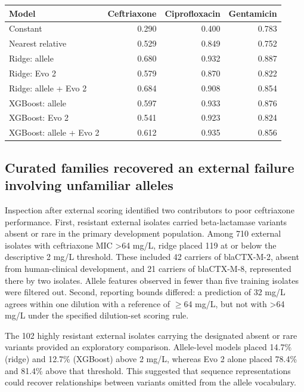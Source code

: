 \documentclass[
  american,
  11pt,
]{article}
\newcounter{none} %
\begin{document}
{\def\LTcaptype{none} %
\begin{longtable}[]{@{}lrrr@{}}
\toprule\noalign{}
Model & Ceftriaxone & Ciprofloxacin & Gentamicin \\
\midrule\noalign{}
\endhead
\bottomrule\noalign{}
\endlastfoot
Constant & 0.290 & 0.400 & 0.783 \\
Nearest relative & 0.529 & 0.849 & 0.752 \\
Ridge: allele & 0.680 & 0.932 & 0.887 \\
Ridge: Evo 2 & 0.579 & 0.870 & 0.822 \\
Ridge: allele + Evo 2 & 0.684 & 0.908 & 0.854 \\
XGBoost: allele & 0.597 & 0.933 & 0.876 \\
XGBoost: Evo 2 & 0.541 & 0.923 & 0.824 \\
XGBoost: allele + Evo 2 & 0.612 & 0.935 & 0.856 \\
\end{longtable}
}

\subsection{Curated families recovered an external failure involving
unfamiliar
alleles}\label{curated-families-recovered-an-external-failure-involving-unfamiliar-alleles}

Inspection after external scoring identified two contributors to poor
ceftriaxone performance. First, resistant external isolates carried
beta-lactamase variants absent or rare in the primary development
population. Among 710 external isolates with ceftriaxone MIC
\textgreater64 mg/L, ridge placed 119 at or below the descriptive 2 mg/L
threshold. These included 42 carriers of blaCTX-M-2, absent from
human-clinical development, and 21 carriers of blaCTX-M-8, represented
there by two isolates. Allele features observed in fewer than five
training isolates were filtered out. Second, reporting bounds differed:
a prediction of 32 mg/L agrees within one dilution with a reference of
\ensuremath{\geq}64 mg/L, but not with \textgreater64 mg/L under the specified
dilution-set scoring rule.

The 102 highly resistant external isolates carrying the designated
absent or rare variants provided an exploratory comparison. Allele-level
models placed 14.7\% (ridge) and 12.7\% (XGBoost) above 2 mg/L, whereas
Evo 2 alone placed 78.4\% and 81.4\% above that threshold. This
suggested that sequence representations could recover relationships
between variants omitted from the allele vocabulary.
\end{document}
